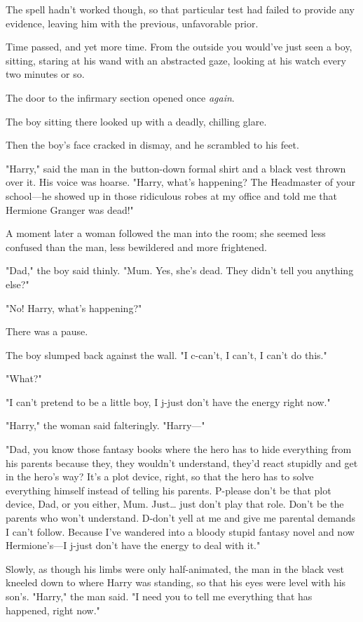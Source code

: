 The spell hadn't worked though, so that particular test had failed to provide
any evidence, leaving him with the previous, unfavorable prior.

Time passed, and yet more time. From the outside you would've just seen a boy,
sitting, staring at his wand with an abstracted gaze, looking at his watch
every two minutes or so.

The door to the infirmary section opened once \emph{again}.

The boy sitting there looked up with a deadly, chilling glare.

Then the boy's face cracked in dismay, and he scrambled to his feet.

"Harry," said the man in the button-down formal shirt and a black vest thrown
over it. His voice was hoarse. "Harry, what's happening? The Headmaster of your
school---he showed up in those ridiculous robes at my office and told me that
Hermione Granger was dead!"

A moment later a woman followed the man into the room; she seemed less confused
than the man, less bewildered and more frightened.

"Dad," the boy said thinly. "Mum. Yes, she's dead. They didn't tell you
anything else?"

"No! Harry, what's happening?"

There was a pause.

The boy slumped back against the wall. "I c-can't, I can't, I can't do this."

"What?"

"I can't pretend to be a little boy, I j-just don't have the energy right now."

"Harry," the woman said falteringly. "Harry---"

"Dad, you know those fantasy books where the hero has to hide everything from
his parents because they, they wouldn't understand, they'd react stupidly and
get in the hero's way? It's a plot device, right, so that the hero has to solve
everything himself instead of telling his parents. P-please don't be that plot
device, Dad, or you either, Mum. Just{\ldots} just don't play that role. Don't
be the parents who won't understand. D-don't yell at me and give me parental
demands I can't follow. Because I've wandered into a bloody stupid fantasy
novel and now Hermione's---I j-just don't have the energy to deal with it."

Slowly, as though his limbs were only half-animated, the man in the black vest
kneeled down to where Harry was standing, so that his eyes were level with his
son's. "Harry," the man said. "I need you to tell me everything that has
happened, right now."

